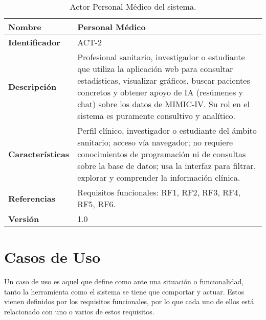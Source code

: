 \begin{table}[H]
    \centering
    \begin{tabular}{|l|p{11cm}|}
        \hline
        \textbf{Nombre} & Personal Médico \\
        \hline
        \textbf{Identificador} & ACT-2 \\
        \hline
        \textbf{Descripción} & Profesional sanitario, investigador o estudiante que utiliza la aplicación web para consultar estadísticas, visualizar gráficos, buscar pacientes concretos y obtener apoyo de IA (resúmenes y chat) sobre los datos de MIMIC-IV. Su rol en el sistema es puramente consultivo y analítico. \\
        \hline
        \textbf{Características} & Perfil clínico, investigador o estudiante del ámbito sanitario; acceso vía navegador; no requiere conocimientos de programación ni de consultas sobre la base de datos; usa la interfaz para filtrar, explorar y comprender la información clínica. \\
        \hline
        \textbf{Referencias} & Requisitos funcionales: RF1, RF2, RF3, RF4, RF5, RF6. \\
        \hline
        \textbf{Versión} & 1.0 \\
        \hline
    \end{tabular}
    \caption{Actor Personal Médico del sistema.}
\end{table}


\section{Casos de Uso}

Un caso de uso es aquel que define como ante una situación o funcionalidad, tanto la herramienta como el sistema se tiene que comportar y actuar. Estos vienen definidos por los requisitos funcionales, por lo que cada uno de ellos está relacionado con uno o varios de estos requisitos.


